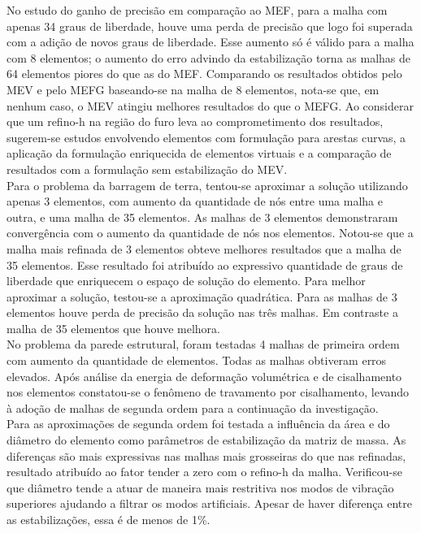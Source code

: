 \indent No estudo do ganho de precisão em comparação ao MEF, para a malha com apenas 34 graus de liberdade, houve uma perda de precisão que logo foi superada com a adição de novos graus de liberdade. Esse aumento só é válido para a malha com 8 elementos; o aumento do erro advindo da estabilização torna as malhas de 64 elementos piores do que as do MEF. Comparando os resultados obtidos pelo MEV e pelo MEFG baseando-se na malha de 8 elementos, nota-se que, em nenhum caso, o MEV atingiu melhores resultados do que o MEFG. Ao considerar que um refino-h na região do furo leva ao comprometimento dos resultados, sugerem-se estudos envolvendo elementos com formulação para arestas curvas, a aplicação da formulação enriquecida de elementos virtuais e a comparação de resultados com a formulação sem estabilização do MEV.\\
\indent Para o problema da barragem de terra, tentou-se aproximar a solução utilizando apenas 3 elementos, com aumento da quantidade de nós entre uma malha e outra, e uma malha de 35 elementos. As malhas de 3 elementos demonstraram convergência com o aumento da quantidade de nós nos elementos. Notou-se que a malha mais refinada de 3 elementos obteve melhores resultados que a malha de 35 elementos. Esse resultado foi atribuído ao expressivo quantidade de graus de liberdade que enriquecem o espaço de solução do elemento. Para melhor aproximar a solução, testou-se a aproximação quadrática. Para as malhas de 3 elementos houve perda de precisão da solução nas três malhas. Em contraste a malha de 35 elementos que houve melhora.\\
\indent No problema da parede estrutural, foram testadas 4 malhas de primeira ordem com aumento da quantidade de elementos. Todas as malhas obtiveram erros elevados. Após análise da energia de deformação volumétrica e de cisalhamento nos elementos constatou-se o fenômeno de travamento por cisalhamento, levando à adoção de malhas de segunda ordem para a continuação da investigação. \\
\indent Para as aproximações de segunda ordem foi testada a influência da área e do diâmetro do elemento como parâmetros de estabilização da matriz de massa. As diferenças são mais expressivas nas malhas mais grosseiras do que nas refinadas, resultado atribuído ao fator tender a zero com o refino-h da malha. Verificou-se que diâmetro tende a atuar de maneira mais restritiva nos modos de vibração superiores ajudando a filtrar os modos artificiais. Apesar de haver diferença entre as estabilizações, essa é de menos de 1\%.\\
